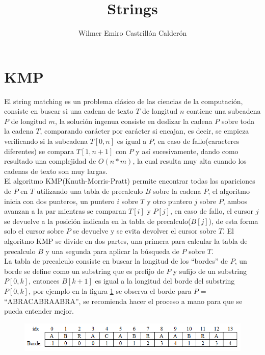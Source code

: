 \documentclass[12pt, a4paper]{article}
\title{\textbf{Strings}}
\author{Wilmer Emiro Castrillón Calderón}
\newcommand{\quotes}[1]{``#1''}
\begin{document}
	\maketitle
	
	
	\section{KMP}
	\label{strings:KMP}
	
	El string matching es un problema clásico de las ciencias de la computación, consiste en buscar si una cadena de 
	texto $T$ de longitud $n$ contiene una subcadena $P$ de longitud $m$, la solución ingenua consiste en deslizar la
	cadena $P$ sobre toda la cadena $T$, comparando carácter por carácter si encajan, es decir, se empieza verificando si
	la subcadena $T[0,n]$ es igual a $P$, en caso de fallo(caracteres diferentes) se compara $T[1,n+1]$ con $P$ y así
	sucesivamente, dando como resultado una complejidad de $O(n*m)$, la cual resulta muy alta cuando los cadenas de 
	texto son muy largas.\\
	
	El algoritmo KMP(Knuth-Morris-Pratt) permite encontrar todas las apariciones de $P$ en $T$ utilizando una
	tabla de precalculo $B$
	sobre la cadena $P$, el algoritmo inicia con dos punteros, un puntero $i$ sobre $T$ y otro puntero $j$ sobre $P$,
	ambos avanzan a la par mientras se comparan $T[i]$ y $P[j]$, en caso de fallo, el cursor $j$ se devuelve a la 
	posición indicada en la tabla de precalculo($B[j]$), de esta forma solo el cursor sobre $P$ se devuelve
	y se evita devolver el cursor sobre $T$. El algoritmo KMP se divide en dos partes, una primera para calcular la 
	tabla de precalculo $B$ y una segunda para aplicar la búsqueda de $P$ sobre $T$.\\
	
	La tabla de precalculo consiste en buscar la longitud de los \quotes{bordes} de $P$, un borde se define como un 
	substring que es prefijo de $P$ y sufijo de un substring $P[0,k]$, entonces $B[k+1]$ es igual a la longitud
	del borde del substring $P[0,k]$, por ejemplo en la figura \ref{strings:KMP:bordes} se observa el
	borde para $P$ = \quotes{ABRACABRAABRA}, se recomienda hacer el proceso a mano para que se pueda entender mejor.
	
	\begin{figure}[!htb]
		\centering
		\includegraphics[scale=0.9]{strings/imagenes/KMP/bordes}
		\caption{}
		\label{strings:KMP:bordes}
	\end{figure}
	
\end{document}

